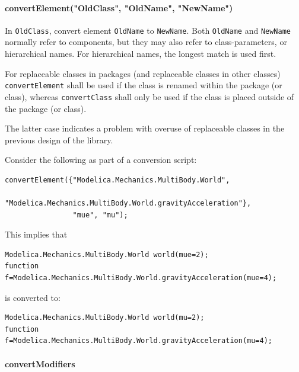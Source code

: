 \paragraph*{convertElement("OldClass", "OldName", "NewName")}\label{convertelementoldclassoldnamenewname}

In \lstinline!OldClass!, convert element \lstinline!OldName! to \lstinline!NewName!.
Both \lstinline!OldName! and \lstinline!NewName! normally refer to components, but they may also refer to class-parameters, or hierarchical names.
For hierarchical names, the longest match is used first.

For replaceable classes in packages (and replaceable classes in other classes) \lstinline!convertElement! shall be used if the class is renamed within the package (or class), whereas \lstinline!convertClass! shall only be used if the class is placed outside of the package (or class).

\begin{nonnormative}
The latter case indicates a problem with overuse of replaceable classes in the previous design of the library.
\end{nonnormative}

\begin{example}
Consider the following as part of a conversion script:
\begin{lstlisting}[language=modelica]
convertElement({"Modelica.Mechanics.MultiBody.World",
                "Modelica.Mechanics.MultiBody.World.gravityAcceleration"},
                "mue", "mu");
\end{lstlisting}
This implies that
\begin{lstlisting}[language=modelica]
Modelica.Mechanics.MultiBody.World world(mue=2);
function f=Modelica.Mechanics.MultiBody.World.gravityAcceleration(mue=4);
\end{lstlisting}
is converted to:
\begin{lstlisting}[language=modelica]
Modelica.Mechanics.MultiBody.World world(mu=2);
function f=Modelica.Mechanics.MultiBody.World.gravityAcceleration(mu=4);
\end{lstlisting}
\end{example}

\paragraph*{convertModifiers}\label{convertmodifiers}
\ %

